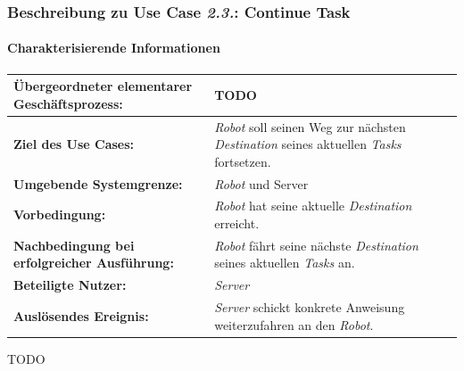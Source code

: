 				\pagebreak
				
				
			\subsubsection{Beschreibung zu Use Case \emph{2.3.}: Continue Task}
			
			\paragraph*{Charakterisierende Informationen}
			
			\begin{table}[H]
				\centering
				\begin{tabularx}{\textwidth}{|p{5cm}|X|}
					\hline
					\textbf{Übergeordneter elementarer Geschäftsprozess:} & TODO  \\ \hline
					\textbf{Ziel des Use Cases:} & \emph{Robot} soll seinen Weg zur nächsten \emph{Destination} seines aktuellen \emph{Tasks} fortsetzen. \\ \hline
					\textbf{Umgebende Systemgrenze:} & \emph{Robot} und {Server} \\ \hline
					\textbf{Vorbedingung:} & \emph{Robot} hat seine aktuelle \emph{Destination} erreicht. \\ \hline
					\textbf{Nachbedingung bei erfolgreicher Ausführung:} & \emph{Robot} fährt seine nächste \emph{Destination} seines aktuellen \emph{Tasks} an. \\ \hline
					\textbf{Beteiligte Nutzer:} & \emph{Server} \\ \hline
					\textbf{Auslösendes Ereignis:} & \emph{Server} schickt konkrete Anweisung weiterzufahren an den \emph{Robot}. \\
					\hline
				\end{tabularx}
			\end{table}
			
			TODO
			
			
			\pagebreak
